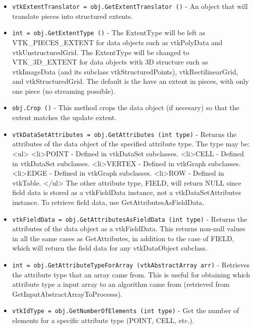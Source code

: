 \begin{itemize}
\item  \verb|vtkExtentTranslator = obj.GetExtentTranslator ()| -  An object that will translate pieces into structured extents.

\item  \verb|int = obj.GetExtentType ()| -  The ExtentType will be left as VTK\_PIECES\_EXTENT for data objects 
 such as vtkPolyData and vtkUnstructuredGrid. The ExtentType will be 
 changed to VTK\_3D\_EXTENT for data objects with 3D structure such as 
 vtkImageData (and its subclass vtkStructuredPoints), vtkRectilinearGrid,
 and vtkStructuredGrid. The default is the have an extent in pieces,
 with only one piece (no streaming possible).

\item  \verb|obj.Crop ()| -  This method crops the data object (if necesary) so that the extent
 matches the update extent.

\item  \verb|vtkDataSetAttributes = obj.GetAttributes (int type)| -  Returns the attributes of the data object of the specified
 attribute type. The type may be:
 <ul>
 <li>POINT  - Defined in vtkDataSet subclasses.
 <li>CELL   - Defined in vtkDataSet subclasses.
 <li>VERTEX - Defined in vtkGraph subclasses.
 <li>EDGE   - Defined in vtkGraph subclasses.
 <li>ROW    - Defined in vtkTable.
 </ul>
 The other attribute type, FIELD, will return NULL since
 field data is stored as a vtkFieldData instance, not a
 vtkDataSetAttributes instance. To retrieve field data, use
 GetAttributesAsFieldData.

\item  \verb|vtkFieldData = obj.GetAttributesAsFieldData (int type)| -  Returns the attributes of the data object as a vtkFieldData.
 This returns non-null values in all the same cases as GetAttributes,
 in addition to the case of FIELD, which will return the field data
 for any vtkDataObject subclass.

\item  \verb|int = obj.GetAttributeTypeForArray (vtkAbstractArray arr)| -  Retrieves the attribute type that an array came from.
 This is useful for obtaining which attribute type a input array
 to an algorithm came from (retrieved from GetInputAbstractArrayToProcesss).

\item  \verb|vtkIdType = obj.GetNumberOfElements (int type)| -  Get the number of elements for a specific attribute type (POINT, CELL, etc.).

\end{itemize}

